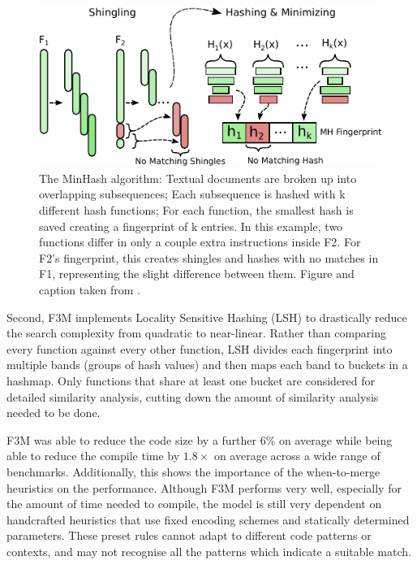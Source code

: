 \begin{figure}[h!]
\centering
\includegraphics[scale=1]{Figures/F3M_MinHash.pdf}
\caption{The MinHash algorithm: Textual documents are broken up into overlapping subsequences; Each subsequence is hashed with k different hash functions; For each function, the smallest hash is saved creating a fingerprint of k entries. In this example, two functions differ in only a couple extra instructions inside F2. For F2’s fingerprint, this creates shingles and hashes with no matches in F1, representing the slight difference between them. Figure and caption taken from  \cite{F3M:FastFocusedFunctionMerging}.}\label{fig:testsvg}
\end{figure}


Second, F3M implements Locality Sensitive Hashing (LSH) to drastically reduce the search complexity from quadratic to near-linear. Rather than comparing every function against every other function, LSH divides each fingerprint into multiple bands (groups of hash values) and then maps each band to buckets in a hashmap. Only functions that share at least one bucket are considered for detailed similarity analysis, cutting down the amount of similarity analysis needed to be done.


F3M was able to reduce the code size by a further $6\%$ on average while being able to reduce the compile time by $1.8\times$ on average across a wide range of benchmarks. Additionally, this shows the importance of the when-to-merge heuristics on the performance. Although F3M performs very well, especially for the amount of time needed to compile, the model is still very dependent on handcrafted heuristics that use fixed encoding schemes and statically determined parameters. These preset rules cannot adapt to different code patterns or contexts, and may not recognise all the patterns which indicate a suitable match.

